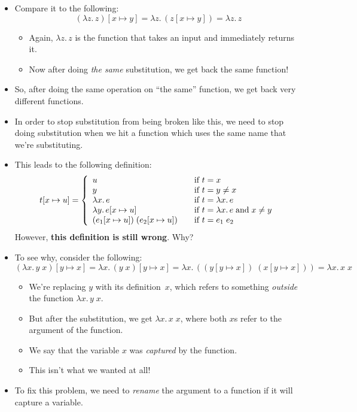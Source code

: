 \documentclass{lecturenotes}
\newcommand{\abs}[2]{\ensuremath{\lambda #1.\,#2}}
\newcommand{\app}[2]{\ensuremath{#1\;#2}}
\begin{document}
\begin{itemize}
\begin{itemize}
  \end{itemize}
\item Compare it to the following:
  $$(\abs{z}{z})[x \mapsto y] = \abs{z}{(z [x \mapsto y])} = \abs{z}{z}$$
  \begin{itemize}
  \item Again, $\abs{z}{z}$ is the function that takes an input and immediately returns it.
  \item Now after doing \emph{the same} substitution, we get back the same function!
  \end{itemize}
\item So, after doing the same operation on ``the same'' function, we get back very different functions.
\item In order to stop substitution from being broken like this, we need to stop doing substitution when we hit a function which uses the same name that we're substituting.
\item This leads to the following definition:
  $$
  t[x \mapsto u] = \left\{
    \begin{array}{l@{\hspace{2em}\text{if}~}l}
      u & t = x \\
      y & t = y \neq x\\
      \abs{x}{e} & t = \abs{x}{e}\\
      \abs{y}{e[x\mapsto u]} & t = \abs{x}{e} \mathrel{\text{and}} x \neq y\\
      \app{(e_1[x\mapsto u])}{(e_2[x \mapsto u])} & t = \app{e_1}{e_2}
    \end{array}\right.
  $$
  However, \textbf{this definition is still wrong}. Why?
\item To see why, consider the following:
  $$(\abs{x}{\app{y}{x}})[y \mapsto x] = \abs{x}{(\app{y}{x})[y \mapsto x]} = \abs{x}{\left(\app{(y [y \mapsto x])}{(x [y \mapsto x])}\right)} = \abs{x}{\app{x}{x}}$$
  \begin{itemize}
  \item We're replacing $y$ with its definition~$x$, which refers to something \emph{outside} the function $\abs{x}{\app{y}{x}}$.
  \item But after the substitution, we get $\abs{x}{\app{x}{x}}$, where both $x$s refer to the argument of the function.
  \item We say that the variable $x$ was \emph{captured} by the function.
  \item This isn't what we wanted at all!
  \end{itemize}
\item To fix this problem, we need to \emph{rename} the argument to a function if it will capture a variable.

\end{itemize}
\end{document}
